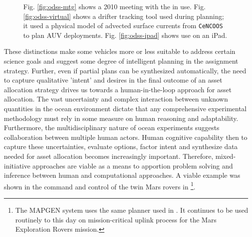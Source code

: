 \begin{figure}
\centering
{}
\caption{\small Fig. \ref{fig:odss-mtg} shows a 2010 \can meeting with
  the \od in use. Fig. \ref{fig:odss-virtual} shows a drifter tracking
  tool used during \can planning; it used a physical model of advected
  surface currents from \texttt{CeNCOOS} \cite{cencoos} to plan AUV
  deployments. Fig. \ref{fig:odss-ipad} shows \od use on an iPad.}
\label{fig:odss2}
\end{figure}


These distinctions make some vehicles more or less suitable to address
certain science goals and suggest some degree of intelligent planning
in the assignment strategy. Further, even if partial plans can be
synthesized automatically, the need to capture qualitative 'intent'
and desires in the final outcome of an asset allocation strategy
drives us towards a human-in-the-loop approach for asset
allocation. The vast uncertainty and complex interaction between
unknown quantities in the ocean environment dictate that any
comprehensive experimental methodology must rely in some measure on
human reasoning and adaptability.  Furthermore, the multidisciplinary
nature of ocean experiments suggests collaboration between multiple
human actors. Human cognitive capability then to capture these
uncertainties, evaluate options, factor intent and synthesize data
needed for asset allocation becomes increasingly important. Therefore,
mixed-initiative approaches are viable as a means to apportion problem
solving and inference between human and computational approaches. A
viable example was shown in the command and control of the twin Mars
rovers in \cite{aichang04,bresina05,bresina05a}\footnote{The MAPGEN
  system uses the same \eu planner used in \rxe. It continues to be
  used routinely to this day on mission-critical uplink process for
  the Mars Exploration Rovers mission.}.

